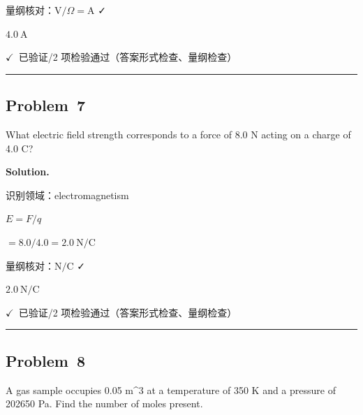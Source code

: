 \documentclass[12pt, a4paper]{article}
\newcommand{\problem}[1]{\subsection*{Problem~#1}}
\newcommand{\solution}{%
  \par\noindent
  {\color{solutiongreen}\bfseries Solution.}\par
}
\newcommand{\verifyok}{\textcolor{solutiongreen}{\ensuremath{\checkmark}\ 已验证}}
\begin{document}
\begin{stepbox}
量纲核对：$\mathrm{V}/\Omega = \mathrm{A}$ ✓
\end{stepbox}

\begin{center}
$\boxed{4.0\ \mathrm{A}}$
\end{center}

\begin{verifybox}\small \verifyok{}/2 项检验通过（答案形式检查、量纲检查） \end{verifybox}

\vspace{0.8em}\hrule\vspace{0.8em}

\problem{7}

\begin{stepbox}
What electric field strength corresponds to a force of 8.0 N acting on a
charge of 4.0 C?
\end{stepbox}

\solution

\begin{stepbox}
识别领域：electromagnetism
\end{stepbox}

\begin{stepbox}
$E = F/q$
\end{stepbox}

\begin{stepbox}
$= 8.0/4.0 = 2.0\ \mathrm{N/C}$
\end{stepbox}

\begin{stepbox}
量纲核对：$\mathrm{N/C}$ ✓
\end{stepbox}

\begin{center}
$\boxed{2.0\ \mathrm{N/C}}$
\end{center}

\begin{verifybox}\small \verifyok{}/2 项检验通过（答案形式检查、量纲检查） \end{verifybox}

\vspace{0.8em}\hrule\vspace{0.8em}

\problem{8}

\begin{stepbox}
A gas sample occupies 0.05 m\textasciicircum{}3 at a temperature of 350 K and a pressure of
202650 Pa. Find the number of moles present.
\end{stepbox}
\end{document}
